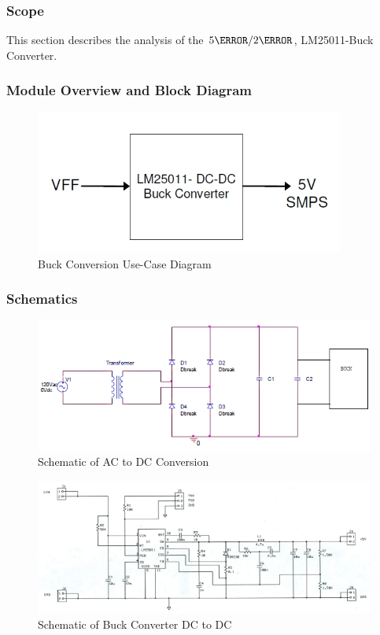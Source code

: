 \subsubsection{Scope}
This section describes the analysis of the $5\volt/2\ampere$, LM25011-Buck Converter.
\subsubsection{Module Overview and Block Diagram}
\begin{figure}[H]
\begin{center}
\includegraphics[width=4in]{includes/BlockDiagram}
\caption{Buck Conversion Use-Case Diagram}
\end{center}
\end{figure}

\clearpage
\subsubsection{Schematics}
\begin{figure}[htbp]
\begin{center}
\includegraphics[width=6.5in,angle=90]{includes/ACtoDC}
\caption{Schematic of AC to DC Conversion}
\end{center}
\end{figure}

\begin{figure}[htbp]
\begin{center}
\includegraphics[width=6.5in,angle=90]{includes/Buck}
\caption{Schematic of Buck Converter DC to DC}
\end{center}
\end{figure}


